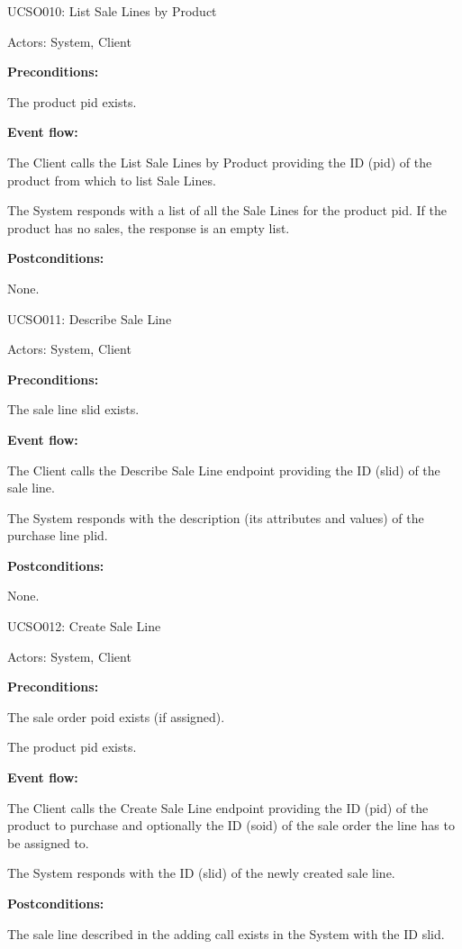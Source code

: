 \begin{ucbox}{UCSO010: List Sale Lines by Product}
\label{UCSO010}

Actors: System, Client

\textbf{Preconditions:}

\ucitem The product pid exists.

\textbf{Event flow:}

\ucitem The Client calls the List Sale Lines by Product providing the ID (pid) of the product from which to list Sale Lines.

\ucitem The System responds with a list of all the Sale Lines for the product pid. If the product has no sales, the response is an empty list.

\textbf{Postconditions:}

\ucitem None.

\end{ucbox}

\begin{ucbox}{UCSO011: Describe Sale Line}
\label{UCSO011}

Actors: System, Client

\textbf{Preconditions:}

\ucitem The sale line slid exists.

\textbf{Event flow:}

\ucitem The Client calls the Describe Sale Line endpoint providing the ID (slid) of the sale line.

\ucitem The System responds with the description (its attributes and values) of the purchase line plid.

\textbf{Postconditions:}

\ucitem None.

\end{ucbox}

\begin{ucbox}{UCSO012: Create Sale Line}
\label{UCSO012}

Actors: System, Client

\textbf{Preconditions:}

\ucitem The sale order poid exists (if assigned).

\ucitem The product pid exists.

\textbf{Event flow:}

\ucitem The Client calls the Create Sale Line endpoint providing the ID (pid) of the product to purchase and optionally the ID (soid) of the sale order the line has to be 
assigned to.

\ucitem The System responds with the ID (slid) of the newly created sale line.

\textbf{Postconditions:}

\ucitem The sale line described in the adding call exists in the System with the ID slid.

\end{ucbox}

